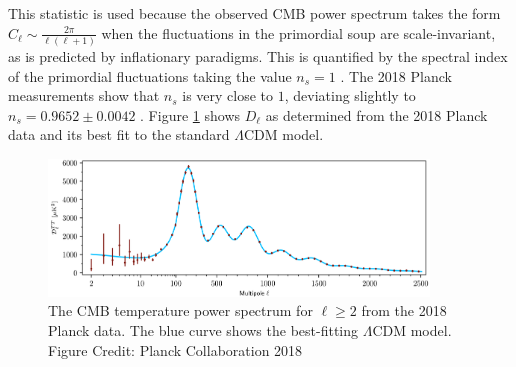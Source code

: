 \documentclass[a4paper,12pt]{report}
\begin{document}
This statistic is used because the observed CMB power spectrum takes the form $C_\ell \sim \frac{2\pi}{\ell(\ell+1)}$ when the fluctuations in the primordial soup are scale-invariant, as is predicted by inflationary paradigms. This is quantified by the spectral index of the primordial fluctuations taking the value $n_s = 1$ \cite{RN177}. The 2018 Planck measurements show that $n_s$ is very close to $1$, deviating slightly to $n_s = 0.9652 \pm  0.0042$ \cite{RN176}. Figure \ref{fig: Planck CMB power spectrum} shows $D_\ell$ as determined from the 2018 Planck data and its best fit to the standard $\Lambda$CDM model.

\begin{figure}[t]
  \centering
  \includegraphics[width=0.9\textwidth]{Planck CMB Power Spectrum TT.png}
  \caption{The CMB temperature power spectrum for $\ell \geq 2$ from the 2018 Planck data. The blue curve shows the best-fitting $\Lambda$CDM model. Figure Credit: Planck Collaboration 2018 \cite{RN32}}
  \label{fig: Planck CMB power spectrum}
\end{figure}
\end{document}
